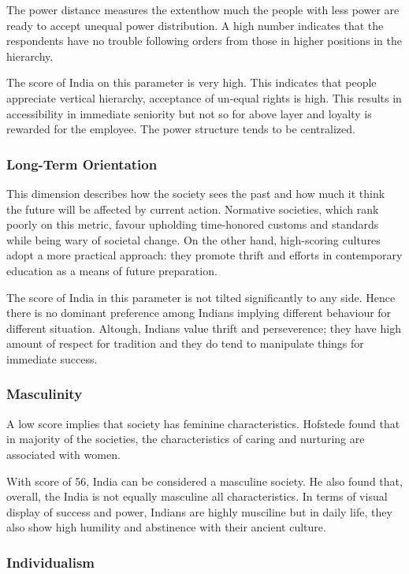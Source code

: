 \documentclass{article}
\begin{document}
The power distance measures the extenthow much the people with less power are ready to accept unequal power distribution. A high number indicates that the respondents have no trouble following orders from those in higher positions in the hierarchy.

The score of India on this parameter is very high. This indicates that people appreciate vertical hierarchy, acceptance of un-equal rights is high. This results in accessibility in immediate seniority but not so for above layer and loyalty is rewarded for the employee. The power structure tends to be centralized.

\subsubsection{Long-Term Orientation}

This dimension describes how the society sees the past and how much it think the future will be affected by current action. Normative societies, which rank poorly on this metric, favour upholding time-honored customs and standards while being wary of societal change. On the other hand, high-scoring cultures adopt a more practical approach: they promote thrift and efforts in contemporary education as a means of future preparation.

The score of India in this parameter is not tilted significantly to any side. Hence there is no dominant preference among Indians implying different  behaviour for different situation. Altough, Indians  value thrift and perseverence; they have high amount of respect for tradition and they do tend to manipulate things for immediate success.

\subsubsection{Masculinity}

A low score implies that society has feminine characteristics. Hofstede found that in majority of the societies, the characteristics of caring and nurturing are associated with women.

With score of 56, India can be considered a masculine society. He also found that, overall, the India is not equally masculine all characteristics. In terms of visual display of success and power, Indians are highly musciline but in daily life, they also show high humility and abstinence with their ancient culture.

\subsubsection{Individualism}
\end{document}
